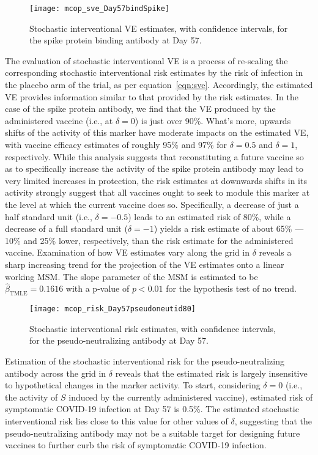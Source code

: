 \begin{figure}[H]
  \centering
  \texttt{[image: mcop\_sve\_Day57bindSpike]}
  \caption{Stochastic interventional VE estimates, with confidence intervals,
    for the spike protein binding antibody at Day 57.}
  \label{fig:marker1-sve-day57}
\end{figure}

The evaluation of stochastic interventional VE is a process of re-scaling the
corresponding stochastic interventional risk estimates by the risk of infection
in the placebo arm of the trial, as per equation~\eqref{eqn:sve}. Accordingly,
the estimated VE provides information similar to that provided by the risk
estimates. In the case of the spike protein antibody, we find that the VE
produced by the administered vaccine (i.e., at $\delta = 0$) is just over 90\%.
What's more, upwards shifts of the activity of this marker have moderate impacts
on the estimated VE, with vaccine efficacy estimates of roughly 95\% and 97\%
for $\delta = 0.5$ and $\delta = 1$, respectively. While this analysis suggests
that reconstituting a future vaccine so as to specifically increase the activity
of the spike protein antibody may lead to very limited increases in protection,
the risk estimates at downwards shifts in its activity strongly suggest that all
vaccines ought to seek to module this marker at the level at which the current
vaccine does so. Specifically, a decrease of just a half standard unit (i.e.,
$\delta = -0.5$) leads to an estimated risk of 80\%, while a decrease of a full
standard unit ($\delta = -1$) yields a risk estimate of about 65\% --- 10\% and
25\% lower, respectively, than the risk estimate for the administered vaccine.
Examination of how VE estimates vary along the grid in $\delta$ reveals a sharp
increasing trend for the projection of the VE estimates onto a linear working
MSM. The slope parameter of the MSM is estimated to be
$\hat{\beta}_{\text{TMLE}} = 0.1616$ with a p-value of $p < 0.01$ for the
hypothesis test of no trend.

\begin{figure}[H]
  \centering
  \texttt{[image: mcop\_risk\_Day57pseudoneutid80]}
  \caption{Stochastic interventional risk estimates, with confidence intervals,
  for the pseudo-neutralizing antibody at Day 57.}
  \label{fig:marker4-risk-day57}
\end{figure}

Estimation of the stochastic interventional risk for the pseudo-neutralizing
antibody across the grid in $\delta$ reveals that the estimated risk is largely
insensitive to hypothetical changes in the marker activity. To start,
considering $\delta = 0$ (i.e., the activity of $S$ induced by the currently
administered vaccine), estimated risk of symptomatic COVID-19 infection at Day
57 is 0.5\%. The estimated stochastic interventional risk lies close to this
value for other values of $\delta$, suggesting that the pseudo-neutralizing
antibody may not be a suitable target for designing future vaccines to further
curb the risk of symptomatic COVID-19 infection.


